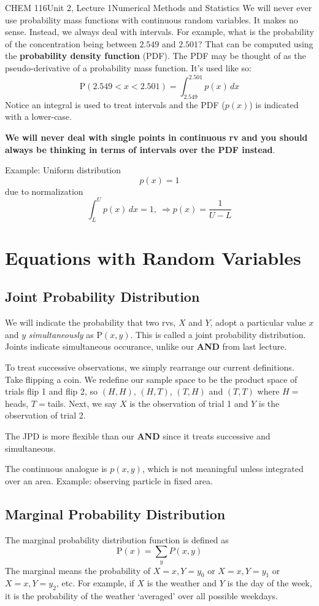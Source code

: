 \documentclass{article}
\renewcommand{\Pr}{\textrm{P}}
\begin{document}
\begin{tdoc}{CHEM 116}{Unit 2, Lecture 1}{Numerical Methods and Statistics}
We will never ever use probability mass functions with continuous
random variables. It makes no sense. Instead, we always deal with
intervals. For example, what is the probability of the concentration
being between $2.549$ and $2.501$? That can be computed using the {\bf
  probability density function} (PDF). The PDF may be thought of as
the pseudo-derivative of a probability mass function. It's used like so:
\[
\Pr(2.549 < x < 2.501) = \int_{2.549}^{2.501} p(x)\,dx
\]
Notice an integral is used to treat intervals and the PDF ($p(x)$) is
indicated with a lower-case. 

{\bf We will never deal with single points in continuous rv and you
  should always be thinking in terms of intervals over the PDF
  instead}.

Example: Uniform distribution
\[
p(x) = 1
\]
due to normalization
\[
\int_L^U p(x) \,dx = 1,\:\Rightarrow p(x) = \frac{1}{U-L}
\]


\section{Equations with Random Variables}

\subsection{Joint Probability Distribution}
We will indicate the probability that two rvs, $X$ and $Y$, adopt a
particular value $x$ and $y$ \emph{simultaneously} as $\Pr(x,y)$. This
is called a joint probability distribution. Joints indicate
simultaneous occurance, unlike our {\bf AND} from last lecture.

To treat successive observations, we simply rearrange our current
definitions. Take flipping a coin. We redefine our sample space to be
the product space of trials flip 1 and flip 2, so $(H,H)$, $(H,T)$,
$(T,H)$ and $(T,T)$ where $H=$heads, $T=$tails. Next, we say $X$ is the
observation of trial 1 and $Y$ is the observation of trial 2.

The JPD is more flexible than our {\bf AND} since it treats successive
and simultaneous.

The continuous analogue is $p(x,y)$, which is not meaningful unless
integrated over an area. Example: observing particle in fixed area.

\subsection{Marginal Probability Distribution}
The marginal probability distribution function is defined as
\begin{equation}
\Pr(x) = \sum_y P(x,y)
\end{equation}
The marginal means the probability of $X=x, Y=y_0$ or $X=x, Y=y_1$ or
$X=x, Y=y_2$, etc. For example, if $X$ is the weather and $Y$ is the
day of the week, it is the probability of the weather `averaged' over
all possible weekdays.


\end{tdoc}
\end{document}
